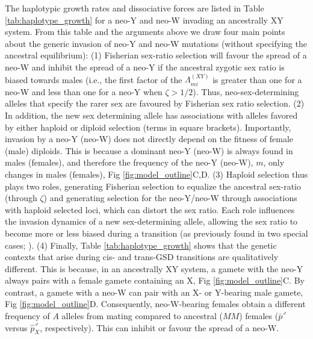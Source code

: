\documentclass[10pt,letterpaper]{article}
\providecommand{\DIFdelend}{} %
\begin{document}
\DIFdelend The haplotypic growth rates and dissociative forces are listed in Table \ref{tab:haplotype_growth} for a neo-Y and neo-W invading an ancestrally XY system.
From this table and the arguments above we draw four main points about the generic invasion of neo-Y and neo-W mutations (without specifying the ancestral equilibrium):
(1) Fisherian sex-ratio selection will favour the spread of a neo-W and inhibit the spread of a neo-Y if the ancestral zygotic sex ratio is biased towards males (i.e., the first factor of the $\Lambda_{mi}^{(XY)}$ is greater than one for a neo-W and less than one for a neo-Y when $\zeta>1/2$).
Thus, neo-sex-determining alleles that specify the rarer sex are favoured by Fisherian sex ratio selection. 
(2) In addition, the new sex determining allele has associations with alleles favored by either haploid or diploid selection (terms in square brackets).    
Importantly, invasion by a neo-Y (neo-W) does not directly depend on the fitness of female (male) diploids. 
This is because a dominant neo-Y (neo-W) is always found in males (females), and therefore the frequency of the neo-Y (neo-W), $m$, only changes in males (females), Fig \ref{fig:model_outline}C,D.
(3) Haploid selection thus plays two roles, generating Fisherian selection to equalize the ancestral sex-ratio (through $\zeta$) and generating selection for the neo-Y/neo-W through associations with haploid selected loci, which can distort the sex ratio. 
Each role influences the invasion dynamics of a new sex-determining allele, allowing the sex ratio to become more or less biased during a transition (as previously found in two special cases; \cite{Kozielska:2010vm,Ubeda:2015fx}). 
(4) Finally, Table \ref{tab:haplotype_growth} shows that the genetic contexts that arise during cis- and trans-GSD transitions are qualitatively different.
This is because, in an ancestrally XY system, a gamete with the neo-Y always pairs with a female gamete containing an X, Fig \ref{fig:model_outline}C.
By contrast, a gamete with a neo-W can pair with an X- or Y-bearing male gamete, Fig \ref{fig:model_outline}D.
Consequently, neo-W-bearing females obtain a different frequency of $A$ alleles from mating compared to ancestral ($MM$) females ($\bar{p}^\male$ versus $\hat{p}_X^\male$, respectively). 
This can inhibit or favour the spread of a neo-W.
\end{document}
